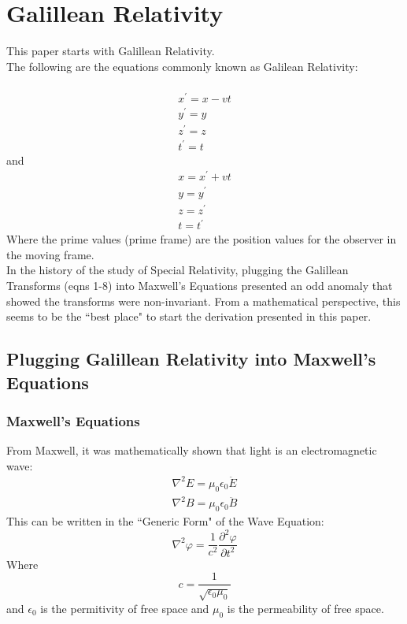 \documentclass[journal]{IEEEtran}
\begin{document}
\section{Galillean Relativity}
This paper starts with Galillean Relativity.\\
The following are the equations commonly known as Galilean
Relativity:\\\\
\begin{eqnarray}
x^\prime = x-vt\\
y^\prime = y\\
z^\prime = z\\
t^\prime = t
\end{eqnarray}
and
\begin{eqnarray}
x = x^\prime+vt\\
y = y^\prime\\
z = z^\prime\\
t = t^\prime
\end{eqnarray}
Where the prime values (prime frame) are the position values for the
observer in the moving frame.\\
In the history of the study of Special Relativity, plugging the
Galillean Transforms (eqns 1-8) into Maxwell's Equations presented an
odd anomaly that showed the transforms were non-invariant.  From a
mathematical perspective, this seems to be the ``best place" to start
the derivation presented in this paper.
\subsection{Plugging Galillean Relativity into Maxwell's Equations}
\subsubsection{Maxwell's Equations}
From Maxwell, it was mathematically shown that light is an
electromagnetic wave:
\begin{eqnarray}
\nabla^2E=\mu_0\epsilon_0\ddot{E}\\
\nabla^2B=\mu_0\epsilon_0\ddot{B}
\end{eqnarray}
This can be written in the ``Generic Form" of the Wave Equation:
\begin{equation}
\nabla^2\varphi=\frac{1}{c^2}\frac{\partial^2 \varphi}{\partial t^2}
\end{equation}
Where
\begin{equation}
c = \frac{1}{\sqrt{\epsilon_0\mu_0}}
\end{equation}
and $\epsilon_0$ is the
permitivity of free space and $\mu_0$ is the permeability of free
space.
\end{document}
